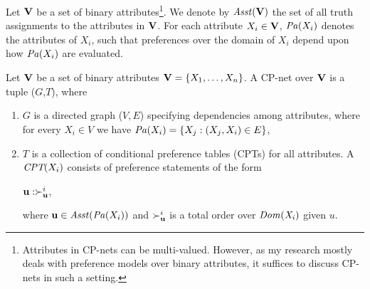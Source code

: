 Let $\textbf{V}$ be a set of binary attributes\footnote{
	Attributes in CP-nets can be multi-valued. However,
	as my research mostly deals with preference models over
	binary attributes, it suffices to discuss CP-nets
	in such a setting.
}.
We denote by $\mathit{Asst}(\textbf{V})$ the set of
all truth assignments to the attributes in $\textbf{V}$.
For each attribute $X_i \in \textbf{V}$, $\mathit{Pa}(X_i)$ denotes the  attributes of
$X_i$, such that preferences over the domain of $X_i$ depend upon how
$\mathit{Pa}(X_i)$ are evaluated.
%
%

\begin{definition}
\label{def:cpn}
	Let $\textbf{V}$ be a set of binary attributes $\textbf{V}=\{X_1,\ldots,X_n\}$.
	A CP-net over $\textbf{V}$ is a tuple ($G$,$T$), where
	\begin{enumerate} \itemsep -4pt
		\item $G$ is a directed graph ($V,E$) specifying
					dependencies among attributes,
					where for every $X_i \in V$ we have
					$\mathit{Pa}(X_i)=\{X_j:(X_j,X_i) \in E\}$,
		\item $T$ is a collection of 
					conditional preference tables (CPTs) for
					all attributes.  A $\textit{CPT}(X_i)$ consists of preference
					statements of the form
					\begin{center}
						$\textbf{u} : \succ^i_{\textbf{u}}$,
					\end{center}
					where $\textbf{u} \in \mathit{Asst}(\mathit{Pa}(X_i))$ and $\succ^i_{\textbf{u}}$
					is a total order over $\it{Dom}(X_i)$ given $u$.
	\end{enumerate}
\end{definition}

